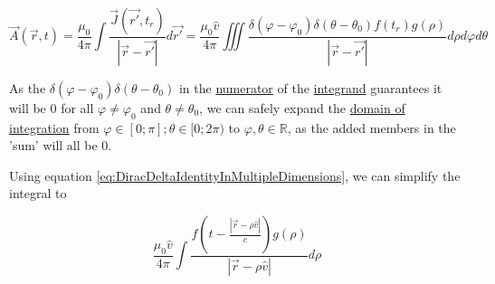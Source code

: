 ﻿\documentclass{article}
\begin{document}
\begin{equation*}
    \vec{A}(\vec{r}, t) = \frac{\mu_0}{4 \pi} \int \frac{\vec{J}(\vec{r'}, t_r)}{|\vec{r} - \vec{r'}|} d \vec{r'} = \frac{\mu_0 \hat{v}}{4 \pi} \iiint \frac{\delta(\varphi - \varphi_0) \delta(\theta - \theta_0) f(t_r) g(\rho)}{|\vec{r} - \vec{r'}|} d \rho d \varphi d \theta
\end{equation*}

As the $\delta(\varphi - \varphi_0) \delta(\theta - \theta_0)$ in the \href{https://en.wikipedia.org/wiki/Fraction}{numerator} of the \href{https://en.wikipedia.org/wiki/Integral#Terminology_and_notation}{integrand} guarantees it will be $0$ for all $\varphi \neq \varphi_0$ and $\theta \neq \theta_0$, we can safely expand the \href{https://en.wikipedia.org/wiki/Integral}{domain of integration} from $\varphi \in [0; \pi]; \theta \in [0; 2 \pi)$ to $\varphi, \theta \in \mathbb{R}$, as the added members in the 'sum' will all be $0$.

Using equation \ref{eq:DiracDeltaIdentityInMultipleDimensions}, we can simplify the integral to

\begin{equation*}
    \frac{\mu_0 \hat{v}}{4 \pi} \int \frac{f(t - \frac{|\vec{r} - \rho \hat{v}|}{c}) g(\rho)}{|\vec{r} - \rho \hat{v}|} d \rho
\end{equation*}
\end{document}
